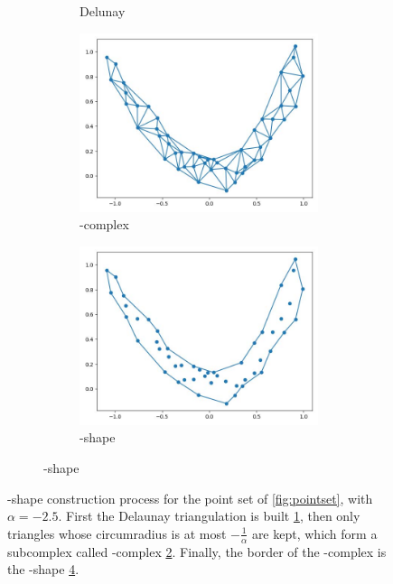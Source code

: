 \begin{figure}[h!]
\begin{subfigure}{1\textwidth}
\begin{subfigure}{0.24\textwidth}
      \caption{Delunay}
      \label{fig:delunay}
    \end{subfigure}
    \begin{subfigure}{0.24\textwidth}
      \centering
      \includegraphics[width=\textwidth]{Images/alpha_3.jpg}
      \caption{\textalpha-complex}
      \label{fig:alphacomplex}
    \end{subfigure}
    \begin{subfigure}{0.24\textwidth}
      \centering
      \includegraphics[width=\textwidth]{Images/alpha_4.jpg}
      \caption{\textalpha-shape}
      \label{fig:alphashape}
    \end{subfigure}
  \end{subfigure}
  \caption{\textalpha-shape construction process for the point set of
  \ref{fig:pointset}, with $\alpha = -2.5$. First the Delaunay triangulation is
  built \ref{fig:delunay}, then only triangles whose circumradius is at most
  $-\frac{1}{\alpha}$ are kept, which form a subcomplex called
  \textalpha-complex \ref{fig:alphacomplex}. Finally, the border of the
  \textalpha-complex is the \textalpha-shape \ref{fig:alphashape}.}
  \label{fig:alphabuild}
\end{figure}

